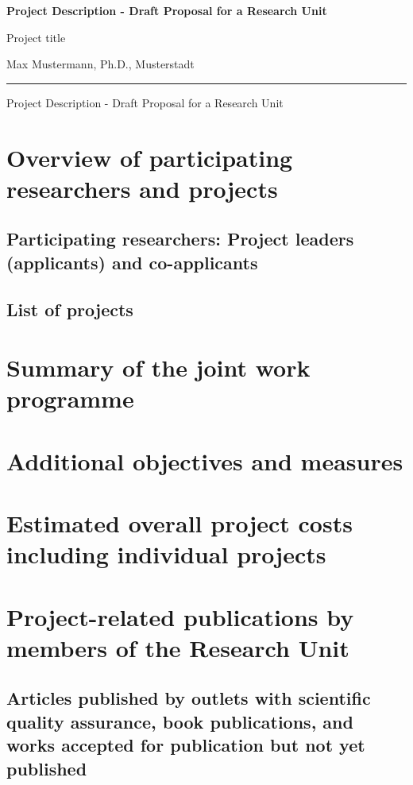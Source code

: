 \documentclass{scrartcl}
\newcommand{\spokesperson}{Max Mustermann, Ph.D., Musterstadt}
\newcommand{\project}{Project title}
\begin{document}
{\raggedright{} \normalsize \bfseries
	Project Description - Draft Proposal for a Research Unit \par
    \project{} \par
    \spokesperson{} \par
	\rule{\textwidth}{0.5pt} \par
	Project Description - Draft Proposal for a Research Unit
}

\section{Overview of participating researchers and projects}

\subsection{Participating researchers: Project leaders (applicants) and co-applicants}

\subsection{List of projects}


\section{Summary of the joint work programme}


\section{Additional objectives and measures}


\section{Estimated overall project costs including individual projects}

\section{Project-related publications by members of the Research Unit}

\subsection{Articles published by outlets with scientific quality assurance, book publications, and works accepted for publication but not yet published}
\printbibliography[category=reviewed, heading=none]
\end{document}
